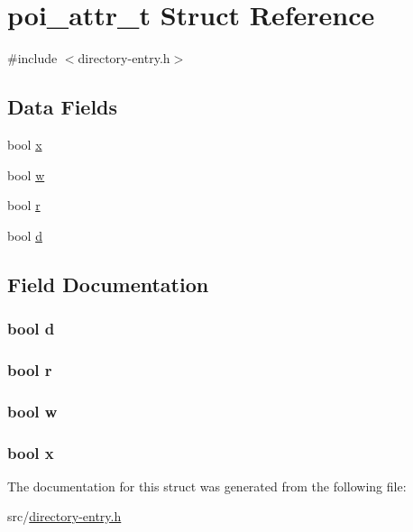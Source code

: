 \hypertarget{structpoi__attr__t}{\section{poi\-\_\-attr\-\_\-t Struct Reference}
\label{structpoi__attr__t}
}


{\ttfamily \#include $<$directory-\/entry.\-h$>$}

\subsection*{Data Fields}
\begin{DoxyCompactItemize}
\item 
bool \hyperlink{structpoi__attr__t_a946a8f8377210c472c7cbdf11f154280}{x}
\item 
bool \hyperlink{structpoi__attr__t_ac2e5f3b10af22c39ed83be143a508b80}{w}
\item 
bool \hyperlink{structpoi__attr__t_a904fc9328a7095487716875e4a892851}{r}
\item 
bool \hyperlink{structpoi__attr__t_a291ac6e121c27d3c9a71d995cf34685c}{d}
\end{DoxyCompactItemize}


\subsection{Field Documentation}
\hypertarget{structpoi__attr__t_a291ac6e121c27d3c9a71d995cf34685c}{
\subsubsection[{d}]{\setlength{\rightskip}{0pt plus 5cm}bool d}}\label{structpoi__attr__t_a291ac6e121c27d3c9a71d995cf34685c}
\hypertarget{structpoi__attr__t_a904fc9328a7095487716875e4a892851}{
\subsubsection[{r}]{\setlength{\rightskip}{0pt plus 5cm}bool r}}\label{structpoi__attr__t_a904fc9328a7095487716875e4a892851}
\hypertarget{structpoi__attr__t_ac2e5f3b10af22c39ed83be143a508b80}{
\subsubsection[{w}]{\setlength{\rightskip}{0pt plus 5cm}bool w}}\label{structpoi__attr__t_ac2e5f3b10af22c39ed83be143a508b80}
\hypertarget{structpoi__attr__t_a946a8f8377210c472c7cbdf11f154280}{
\subsubsection[{x}]{\setlength{\rightskip}{0pt plus 5cm}bool x}}\label{structpoi__attr__t_a946a8f8377210c472c7cbdf11f154280}


The documentation for this struct was generated from the following file\-:\begin{DoxyCompactItemize}
\item 
src/\hyperlink{directory-entry_8h}{directory-\/entry.\-h}\end{DoxyCompactItemize}
